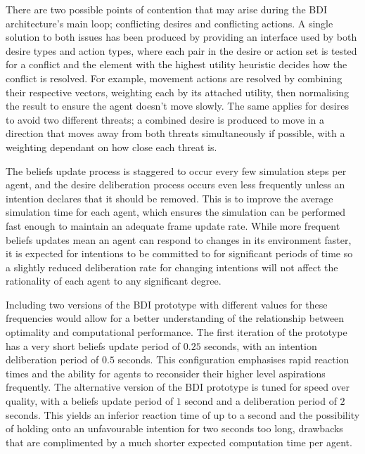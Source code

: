 \documentclass[a4paper,12pt]{article}
\begin{document}
There are two possible points of contention that may arise during the BDI architecture's main loop; conflicting desires and conflicting actions. A single solution to both issues has been produced by providing an interface used by both desire types and action types, where each pair in the desire or action set is tested for a conflict and the element with the highest utility heuristic decides how the conflict is resolved. For example, movement actions are resolved by combining their respective vectors, weighting each by its attached utility, then normalising the result to ensure the agent doesn't move slowly. The same applies for desires to avoid two different threats; a combined desire is produced to move in a direction that moves away from both threats simultaneously if possible, with a weighting dependant on how close each threat is.

The beliefs update process is staggered to occur every few simulation steps per agent, and the desire deliberation process occurs even less frequently unless an intention declares that it should be removed. This is to improve the average simulation time for each agent, which ensures the simulation can be performed fast enough to maintain an adequate frame update rate. While more frequent beliefs updates mean an agent can respond to changes in its environment faster, it is expected for intentions to be committed to for significant periods of time \cite{bonura09} so a slightly reduced deliberation rate for changing intentions will not affect the rationality of each agent to any significant degree.

Including two versions of the BDI prototype with different values for these frequencies would allow for a better understanding of the relationship between optimality and computational performance. The first iteration of the prototype has a very short beliefs update period of $0.25$ seconds, with an intention deliberation period of $0.5$ seconds. This configuration emphasises rapid reaction times and the ability for agents to reconsider their higher level aspirations frequently. The alternative version of the BDI prototype is tuned for speed over quality, with a beliefs update period of $1$ second and a deliberation period of $2$ seconds. This yields an inferior reaction time of up to a second and the possibility of holding onto an unfavourable intention for two seconds too long, drawbacks that are complimented by a much shorter expected computation time per agent.
\end{document}
